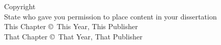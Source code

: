 \pagestyle{empty}
\vspace*{\fill}
\begin{center}
    Copyright \\
    State who gave you permission to place content in your dissertation \\
    This Chapter \copyright \ This Year, This Publisher\\
    That Chapter \copyright \ That Year, That Publisher
\end{center}
\vspace*{\fill}